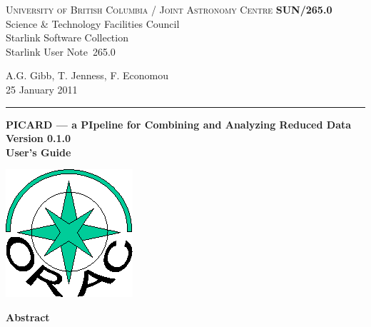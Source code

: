 \documentclass[twoside,11pt]{article}
\newcommand{\stardoccategory}  {Starlink User Note}
\newcommand{\stardocinitials}  {SUN}
\newcommand{\stardocnumber}    {265.0}
\newcommand{\stardocauthors}   {A.G. Gibb, T. Jenness, F. Economou}
\newcommand{\stardocdate}      {25 January 2011}
\newcommand{\stardoctitle}     {PICARD --- a PIpeline for Combining and Analyzing Reduced Data}
\newcommand{\stardocversion}   {Version 0.1.0}
\newcommand{\stardocmanual}    {User's Guide}
\newcommand{\stardocname}{\stardocinitials /\stardocnumber}
\newenvironment{latexonly}{}{}
\renewcommand{\_}{\texttt{\symbol{95}}}
\begin{document}
\thispagestyle{empty}

\begin{latexonly}
   \textsc{University of British Columbia} / \textsc{Joint Astronomy Centre} \hfill \textbf{\stardocname}\\
   {\large Science \& Technology Facilities Council}\\
   {\large Starlink Software Collection\\}
   {\large \stardoccategory\ \stardocnumber}
   \begin{flushright}
   \stardocauthors\\
   \stardocdate
   \end{flushright}
   \vspace{-4mm}
   \rule{\textwidth}{0.5mm}
   \vspace{5mm}
   \begin{center}
   {\Huge\textbf{\stardoctitle \\ [2.5ex]}}
   {\LARGE\textbf{\stardocversion \\ [4ex]}}
   {\Huge\textbf{\stardocmanual}}
   \end{center}
   \vspace{5mm}

\begin{center}
\includegraphics[scale=0.3]{sun265_logo}
\end{center}

   \vspace{10mm}
   \begin{center}
      {\Large\textbf{Abstract}}
   \end{center}
\end{latexonly}
\end{document}
